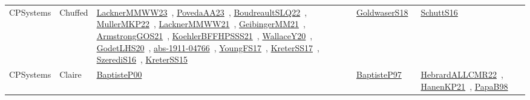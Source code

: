 {\begin{longtable}{lp{3cm}>{\raggedright\arraybackslash}p{6cm}>{\raggedright\arraybackslash}p{6cm}>{\raggedright\arraybackslash}p{8cm}}
CPSystems & Chuffed & \href{works/LacknerMMWW23.pdf}{LacknerMMWW23}~\cite{LacknerMMWW23}, \href{works/PovedaAA23.pdf}{PovedaAA23}~\cite{PovedaAA23}, \href{works/BoudreaultSLQ22.pdf}{BoudreaultSLQ22}~\cite{BoudreaultSLQ22}, \href{works/MullerMKP22.pdf}{MullerMKP22}~\cite{MullerMKP22}, \href{works/LacknerMMWW21.pdf}{LacknerMMWW21}~\cite{LacknerMMWW21}, \href{works/GeibingerMM21.pdf}{GeibingerMM21}~\cite{GeibingerMM21}, \href{works/ArmstrongGOS21.pdf}{ArmstrongGOS21}~\cite{ArmstrongGOS21}, \href{works/KoehlerBFFHPSSS21.pdf}{KoehlerBFFHPSSS21}~\cite{KoehlerBFFHPSSS21}, \href{works/WallaceY20.pdf}{WallaceY20}~\cite{WallaceY20}, \href{works/GodetLHS20.pdf}{GodetLHS20}~\cite{GodetLHS20}, \href{works/abs-1911-04766.pdf}{abs-1911-04766}~\cite{abs-1911-04766}, \href{works/YoungFS17.pdf}{YoungFS17}~\cite{YoungFS17}, \href{works/KreterSS17.pdf}{KreterSS17}~\cite{KreterSS17}, \href{works/SzerediS16.pdf}{SzerediS16}~\cite{SzerediS16}, \href{works/KreterSS15.pdf}{KreterSS15}~\cite{KreterSS15} & \href{works/GoldwaserS18.pdf}{GoldwaserS18}~\cite{GoldwaserS18} & \href{works/SchuttS16.pdf}{SchuttS16}~\cite{SchuttS16}\\
CPSystems & Claire & \href{works/BaptisteP00.pdf}{BaptisteP00}~\cite{BaptisteP00} & \href{works/BaptisteP97.pdf}{BaptisteP97}~\cite{BaptisteP97} & \href{works/HebrardALLCMR22.pdf}{HebrardALLCMR22}~\cite{HebrardALLCMR22}, \href{works/HanenKP21.pdf}{HanenKP21}~\cite{HanenKP21}, \href{works/PapaB98.pdf}{PapaB98}~\cite{PapaB98}\\

\end{longtable}}
